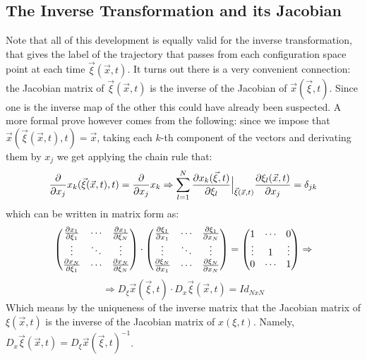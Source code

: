 \documentclass[11pt, a4paper]{article} %
\begin{document}
\subsection*{ The Inverse Transformation and its Jacobian\vspace{-0.2cm}}
Note that all of this development is equally valid for the inverse transformation, that gives the label of the trajectory that passes from each configuration space point at each time $\vec{\xi}(\vec{x},t)$. It turns out there is a very convenient connection: the Jacobian matrix of $\vec{\xi}(\vec{x},t)$ is the inverse of the Jacobian of $\vec{x}(\vec{\xi},t)$. Since one is the inverse map of the other this could have already been suspected. A more formal prove however comes from the following: since we impose that $\vec{x}(\vec{\xi}(\vec{x},t),t)=\vec{x}$, taking each $k$-th component of the vectors and derivating them by $x_j$ we get applying the chain rule that: \vspace{-0.1cm}
\begin{equation}
\pdv{}{x_j}x_k(\vec{\xi}(\vec{x},t),t)=\pdv{}{x_j}x_k \Rightarrow \sum_{l=1}^N \pdv{x_k(\vec{\xi},t)}{\xi_l}\Big\rvert_{\vec{\xi}(\vec{x},t)}\pdv{\xi_l(\vec{x},t)}{x_j}=\delta_{jk} \vspace{-0.2cm}
\end{equation}
which can be written in matrix form as:
\begin{equation}\label{inverse}
\begin{pmatrix}
\pdv{x_1}{\xi_1}&\cdots&\pdv{x_1}{\xi_N} \\
\vdots &\ddots& \vdots \\
\pdv{x_N}{\xi_1}&\cdots&\pdv{x_N}{\xi_N}
\end{pmatrix}\cdot \begin{pmatrix}
\pdv{\xi_1}{x_1}&\cdots&\pdv{\xi_1}{x_N} \\
\vdots & \ddots & \vdots \\
\pdv{\xi_N}{x_1}&\cdots&\pdv{\xi_N}{x_N}
\end{pmatrix}=\begin{pmatrix}
1&\cdots &0 \\
\vdots & 1& \vdots \\
0&\cdots &1
\end{pmatrix}\Rightarrow
\end{equation}
$$
\Rightarrow D_\xi \vec{x}(\vec{\xi},t)\cdot D_x \vec{\xi}(\vec{x},t) = Id_{NxN}
$$
Which means by the uniqueness of the inverse matrix that the Jacobian matrix of $\xi(\vec{x},t)$ is the inverse of the Jacobian matrix of $x(\xi,t)$. Namely, $D_x \vec{\xi}(\vec{x},t)=D_\xi \vec{x}(\vec{\xi},t)^{-1}$.
\end{document}
